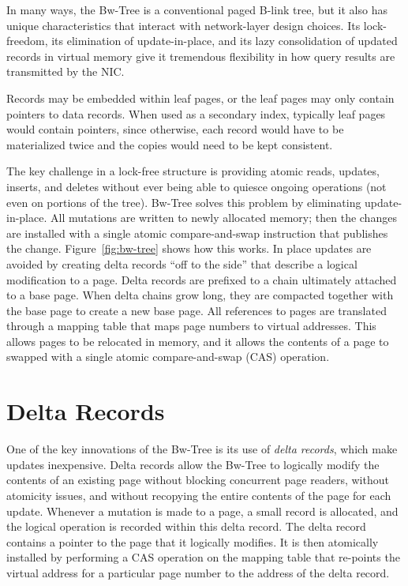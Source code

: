 In many ways, the Bw-Tree is a conventional paged B-link tree,
but it also has unique characteristics that interact with network-layer
design choices. Its lock-freedom, its elimination of update-in-place,
and its lazy consolidation of updated records in virtual memory give it
tremendous flexibility in how query results are transmitted by the NIC.

Records may be embedded within leaf pages, or the leaf pages may
only contain pointers to data records. When used as a secondary index,
typically leaf pages would contain pointers, since otherwise, each record would
have to be materialized twice and the copies would need to be kept consistent.

The key challenge in a lock-free structure is providing atomic reads, updates,
inserts, and deletes without ever being able to quiesce ongoing operations (not
even on portions of the tree). Bw-Tree solves this problem by eliminating
update-in-place. All mutations are written to newly allocated memory; then
the changes are installed with a single atomic compare-and-swap instruction
that publishes the change.  Figure~\ref{fig:bw-tree} shows how this works.
In place updates are avoided by creating delta records ``off to the side'' 
that describe a logical modification to a page. Delta records are
prefixed to a chain ultimately attached to a base page.  When delta chains
grow long, they are compacted together with the base page to create a new base page.
All references to pages are translated through a mapping table that maps page
numbers to virtual addresses. This allows pages to be relocated in memory, and
it allows the contents of a page to swapped with a single atomic
compare-and-swap (CAS) operation.
\section{Delta Records}
\label{sec:deltarecords}
One of the key innovations of the Bw-Tree is its use of {\em delta records},
which make updates inexpensive.
Delta records allow the Bw-Tree to logically modify the
contents of an existing page without blocking concurrent page readers, without
atomicity issues, and without recopying the entire contents of the page for
each update.  Whenever a mutation is made to a page, a small record is
allocated, and the logical operation is recorded within this delta record. The delta
record contains a pointer to the page that it logically modifies. It
is then atomically installed by performing a CAS operation on the
mapping table that re-points the virtual address for a particular page number
to the address of the delta record.

